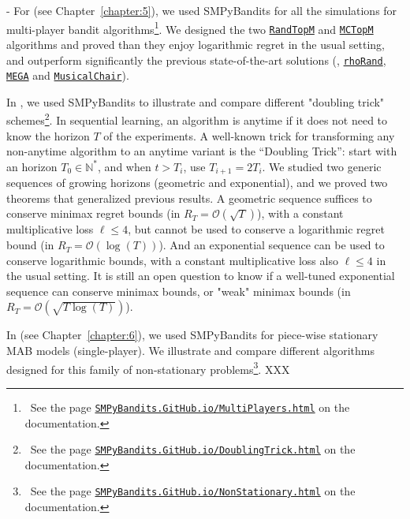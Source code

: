 - For \cite{Besson2018ALT} (see Chapter~\ref{chapter:5}), we used SMPyBandits for all the simulations for multi-player bandit algorithms\footnote{~See the page \texttt{\href{https://SMPyBandits.GitHub.io/MultiPlayers.html}{SMPyBandits.GitHub.io/MultiPlayers.html}} on the documentation.}. We designed the two \texttt{\href{https://SMPyBandits.GitHub.io/docs/PoliciesMultiPlayers.RandTopM.html}{RandTopM}} and \texttt{\href{https://SMPyBandits.GitHub.io/docs/PoliciesMultiPlayers.MCTopM.html}{MCTopM}} algorithms and proved than they enjoy logarithmic regret in the usual setting, and outperform significantly the previous state-of-the-art solutions (\ie, \texttt{\href{https://SMPyBandits.GitHub.io/docs/PoliciesMultiPlayers.rhoRand.html}{rhoRand}}, \texttt{\href{https://SMPyBandits.GitHub.io/docs/Policies.MEGA.html}{MEGA}} and \texttt{\href{https://SMPyBandits.GitHub.io/docs/Policies.MusicalChair.html}{MusicalChair}}).

In \cite{Besson2018DoublingTricks}, we used SMPyBandits to illustrate and compare different "doubling trick" schemes\footnote{~See the page \texttt{\href{https://SMPyBandits.GitHub.io/DoublingTrick.html}{SMPyBandits.GitHub.io/DoublingTrick.html}} on the documentation.}. In sequential learning, an algorithm is anytime if it does not need to know the horizon $T$ of the experiments. A well-known trick for transforming any non-anytime algorithm to an anytime variant is the ``Doubling Trick'': start with an horizon $T_0\in\mathbb{N}^*$, and when $t > T_i$, use $T_{i+1} = 2 T_i$. We studied two generic sequences of growing horizons (geometric and exponential), and we proved two theorems that generalized previous results. A geometric sequence suffices to conserve minimax regret bounds (in $R_T = \mathcal{O}(\sqrt{T})$), with a constant multiplicative loss $\ell \leq 4$, but cannot be used to conserve a logarithmic regret bound (in $R_T = \mathcal{O}(\log(T))$). And an exponential sequence can be used to conserve logarithmic bounds, with a constant multiplicative loss also $\ell \leq 4$ in the usual setting. It is still an open question to know if a well-tuned exponential sequence can conserve minimax bounds, or "weak" minimax bounds (in $R_T = \mathcal{O}(\sqrt{T \log(T)})$).

In \cite{Besson2019GLRT} (see Chapter~\ref{chapter:6}), we used SMPyBandits for piece-wise stationary MAB models (single-player). We illustrate and compare different algorithms designed for this family of non-stationary problems\footnote{~See the page \texttt{\href{https://SMPyBandits.GitHub.io/NonStationary.html}{SMPyBandits.GitHub.io/NonStationary.html}} on the documentation.}. XXX

